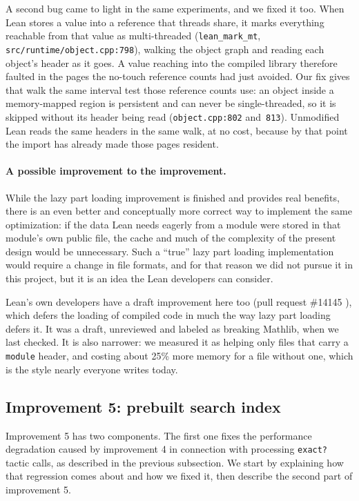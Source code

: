 \documentclass{article}
\newcommand{\Lean}{Lean\xspace}      %
\newcommand{\mathlib}{Mathlib\xspace}
\begin{document}
A second bug came to light in the same experiments, and we fixed it too. When \Lean stores a value into a reference that threads share, it marks everything reachable from that value as multi-threaded (\texttt{lean\_mark\_mt}, \texttt{src/runtime/object.cpp:798}), walking the object graph and reading each object's header as it goes. A value reaching into the compiled library therefore faulted in the pages the no-touch reference counts had just avoided. Our fix gives that walk the same interval test those reference counts use: an object inside a memory-mapped region is persistent and can never be single-threaded, so it is skipped without its header being read (\texttt{object.cpp:802} and~\texttt{813}). Unmodified \Lean reads the same headers in the same walk, at no cost, because by that point the import has already made those pages resident.

\paragraph{A possible improvement to the improvement.}
While the lazy part loading improvement is finished and provides real benefits, there is an even better and conceptually more correct way to implement the same optimization: if the data \Lean needs eagerly from a module were stored in that module's own public file, the cache and much of the complexity of the present design would be unnecessary. Such a ``true'' lazy part loading implementation would require a change in file formats, and for that reason we did not pursue it in this project, but it is an idea the \Lean developers can consider.

\Lean's own developers have a draft improvement here too (pull request \#14145 \cite{lean14145}), which defers the loading of compiled code in much the way lazy part loading defers it. It was a draft, unreviewed and labeled as breaking \mathlib, when we last checked. It is also narrower: we measured it as helping only files that carry a \texttt{module} header, and costing about 25\% more memory for a file without one, which is the style nearly everyone writes today.

\subsection{Improvement 5: prebuilt search index}
\label{sec:tn-5}

Improvement 5 has two components. The first one fixes the performance degradation caused by improvement 4 in connection with processing \texttt{exact?} tactic calls, as described in the previous subsection. We start by explaining how that regression comes about and how we fixed it, then describe the second part of improvement 5.
\end{document}
